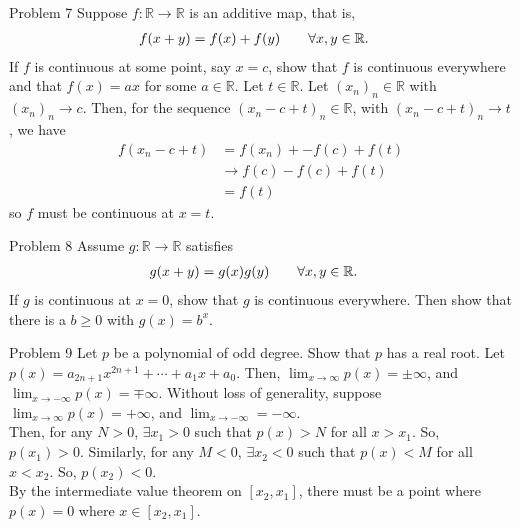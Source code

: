 \documentclass[10pt]{extarticle}
\newcommand{\R}{\mathbb{R}}
\begin{document}
  \begin{problem}{Problem 7}
    Suppose $f: \R \rightarrow \R$ is an additive map, that is,
    \begin{align*}
      f(x+y) &= f(x) + f(y) \tag*{$\forall x,y\in \R$.}
    \end{align*}
    If $f$ is continuous at some point, say $x=c$, show that $f$ is continuous everywhere and that $f(x) = ax$ for some $a\in\R$.
    \tcblower
    Let $t\in\R$. Let $(x_n)_n \in \R$ with $(x_n)_n \rightarrow c$. Then, for the sequence $(x_n - c + t)_n\in\R$, with $(x_n - c + t)_n \rightarrow t$, we have
    \begin{align*}
      f(x_n - c + t) &= f(x_n) + - f(c) + f(t)\\
                 &\rightarrow f(c) - f(c) + f(t)\\
                 &= f(t)
    \end{align*}
    so $f$ must be continuous at $x = t$.
  \end{problem}
  \begin{problem}{Problem 8}
    Assume $g: \R\rightarrow \R$ satisfies
    \begin{align*}
      g(x+y) &= g(x)g(y) \tag*{$\forall x,y\in\R$.}
    \end{align*}
    If $g$ is continuous at $x=0$, show that $g$ is continuous everywhere. Then show that there is a $b\geq 0$ with $g(x) = b^x$.
  \end{problem}
  \begin{problem}{Problem 9}
    Let $p$ be a polynomial of odd degree. Show that $p$ has a real root.
    \tcblower
    Let $p(x) = a_{2n+1}x^{2n+1} + \cdots + a_{1}x + a_0$. Then, $\lim_{x\rightarrow\infty}p(x) = \pm \infty$, and $\lim_{x\rightarrow -\infty} p(x) = \mp \infty$. Without loss of generality, suppose $\lim_{x\rightarrow\infty}p(x) = +\infty$, and $\lim_{x\rightarrow-\infty} = -\infty$.\\

    Then, for any $N > 0$, $\exists x_1 > 0$ such that $p(x) > N$ for all $x > x_1$. So, $p(x_1) > 0$. Similarly, for any $M < 0$, $\exists x_2 < 0$ such that $p(x) < M$ for all $x < x_2$. So, $p(x_2) < 0$.\\

    By the intermediate value theorem on $[x_2,x_1]$, there must be a point where $p(x) = 0$ where $x\in [x_2,x_1]$.
  \end{problem}
\end{document}
